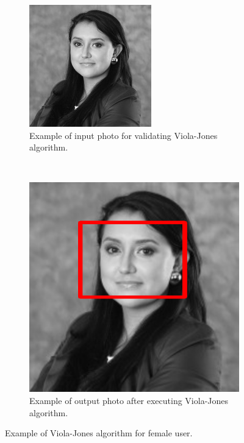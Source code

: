 \documentclass[11pt]{report} %
\begin{document}
\begin{figure}[H]
	\centering
	\begin{subfigure}{.5\textwidth}
		\centering
		\includegraphics[width=0.9\linewidth]{assets/imgs/computer_vision/computer_vision_dolly.png}
		\caption{Example of input photo for validating Viola-Jones algorithm.}
		\label{fig_original_dolly}
	\end{subfigure}~
	\begin{subfigure}{.5\textwidth}
		\centering
		\includegraphics[width=0.9\linewidth]{assets/imgs/computer_vision/computer_vision_dolly_detected.png}
		\caption{Example of output photo after executing Viola-Jones algorithm.}
		\label{fig_detected_dolly}
	\end{subfigure}%
	\caption{Example of Viola-Jones algorithm for female user.}
	\label{fig_detecting_dolly}
\end{figure}
\end{document}
